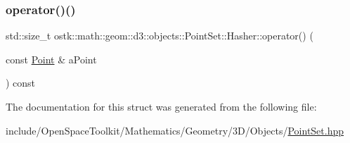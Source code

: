 \subsubsection{\texorpdfstring{operator()()}{operator()()}}
{\footnotesize\ttfamily std\+::size\+\_\+t ostk\+::math\+::geom\+::d3\+::objects\+::\+Point\+Set\+::\+Hasher\+::operator() (\begin{DoxyParamCaption}\item[{const \hyperlink{classostk_1_1math_1_1geom_1_1d3_1_1objects_1_1_point}{Point} \&}]{a\+Point }\end{DoxyParamCaption}) const\hspace{0.3cm}{\ttfamily [inline]}}



The documentation for this struct was generated from the following file\+:\begin{DoxyCompactItemize}
\item 
include/\+Open\+Space\+Toolkit/\+Mathematics/\+Geometry/3\+D/\+Objects/\hyperlink{3_d_2_objects_2_point_set_8hpp}{Point\+Set.\+hpp}\end{DoxyCompactItemize}
